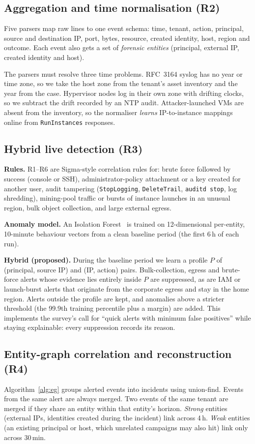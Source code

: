 \documentclass[conference,10pt]{IEEEtran}
\begin{document}
\subsection{Aggregation and time normalisation (R2)}
Five parsers map raw lines to one event schema: time, tenant, action, principal, source and destination IP, port, bytes, resource, created identity, host, region and outcome. Each event also gets a set of \emph{forensic entities} (principal, external IP, created identity and host).

The parsers must resolve three time problems. RFC~3164 syslog has no year or time zone, so we take the host zone from the tenant's asset inventory and the year from the case. Hypervisor nodes log in their own zone with drifting clocks, so we subtract the drift recorded by an NTP audit. Attacker-launched VMs are absent from the inventory, so the normaliser \emph{learns} IP-to-instance mappings online from \texttt{RunInstances} responses.

\subsection{Hybrid live detection (R3)}
\textbf{Rules.} R1--R6 are Sigma-style correlation rules for: brute force followed by success (console or SSH), administrator-policy attachment or a key created for another user, audit tampering (\texttt{StopLogging}, \texttt{DeleteTrail}, \texttt{auditd stop}, log shredding), mining-pool traffic or bursts of instance launches in an unusual region, bulk object collection, and large external egress.

\textbf{Anomaly model.} An Isolation Forest~\cite{liu2008} is trained on 12-dimensional per-entity, 10-minute behaviour vectors from a clean baseline period (the first 6\,h of each run).

\textbf{Hybrid (proposed).} During the baseline period we learn a profile $P$ of (principal, source IP) and (IP, action) pairs. Bulk-collection, egress and brute-force alerts whose evidence lies entirely inside $P$ are suppressed, as are IAM or launch-burst alerts that originate from the corporate egress and stay in the home region. Alerts outside the profile are kept, and anomalies above a stricter threshold (the 99.9th training percentile plus a margin) are added. This implements the survey's call for ``quick alerts with minimum false positives'' while staying explainable: every suppression records its reason.

\subsection{Entity-graph correlation and reconstruction (R4)}
Algorithm~\ref{alg:eg} groups alerted events into incidents using union-find. Events from the same alert are always merged. Two events of the same tenant are merged if they share an entity within that entity's horizon. \emph{Strong} entities (external IPs, identities created during the incident) link across 4\,h. \emph{Weak} entities (an existing principal or host, which unrelated campaigns may also hit) link only across 30\,min.
\end{document}
